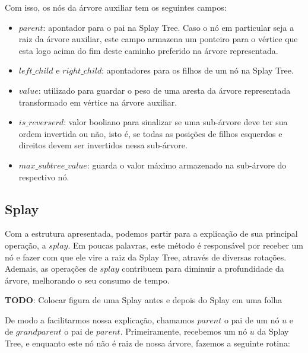 Com isso, os nós da árvore auxiliar tem os seguintes campos:

\begin{itemize}
    \item $parent$: apontador para o pai na Splay Tree. Caso o nó em particular seja a raiz da árvore auxiliar, este campo armazena um ponteiro para o vértice que esta logo acima do fim deste caminho preferido na árvore representada.
    \item $left\_child$ e $right\_child$: apontadores para os filhos de um nó na Splay Tree.
    \item $value$: utilizado para guardar o peso de uma aresta da árvore representada transformado em vértice na árvore auxiliar.
    \item $is\_reverserd$: valor booliano para sinalizar se uma sub-árvore deve ter sua ordem invertida ou não, isto é, se todas as posições de filhos esquerdos e direitos devem ser invertidos nessa  sub-árvore.
    \item $max\_subtree\_value$: guarda o valor máximo armazenado na sub-árvore do respectivo nó.
\end{itemize}

\subsection{Splay}
\label{subsection:lct-splay-splay}

Com a estrutura apresentada, podemos partir para a explicação de sua principal operação, a $splay$. Em poucas palavras, este método é responsável por receber um nó e fazer com que ele vire a raiz da Splay Tree, através de diversas rotações. Ademais, as operações de $splay$ contribuem para diminuir a profundidade da árvore, melhorando o seu consumo de tempo.

\begin{center}
    \textbf{TODO}: Colocar figura de uma Splay antes e depois do Splay em uma folha
\end{center}

De modo a facilitarmos nossa explicação, chamamos $parent$ o pai de um nó $u$ e de $grandparent$ o pai de $parent$. Primeiramente, recebemos um nó $u$ da Splay Tree, e enquanto este nó não é raiz de nossa árvore, fazemos a seguinte rotina:

